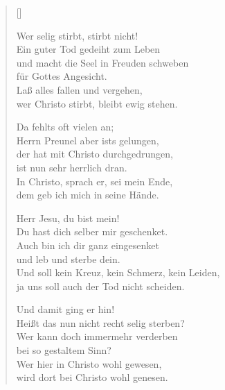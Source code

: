 \begin{multicols}{2}

\settowidth{\versewidth}{Und soll kein Kreuz, kein Schmerz, kein Leiden,}
\begin{verse}[\versewidth]

 Wer selig stirbt, stirbt nicht!\\
Ein guter Tod gedeiht zum Leben\\
und macht die Seel in Freuden schweben\\
für Gottes Angesicht.\\
Laß alles fallen und vergehen,\\
wer Christo stirbt, bleibt ewig stehen.

 Da fehlts oft vielen an;\\
Herrn Preunel aber ists gelungen,\\
der hat mit Christo durchgedrungen,\\
ist nun sehr herrlich dran.\\
In Christo, sprach er, sei mein Ende,\\
dem geb ich mich in seine Hände.

 Herr Jesu, du bist mein!\\
Du hast dich selber mir geschenket.\\
Auch bin ich dir ganz eingesenket\\
und leb und sterbe dein.\\
Und soll kein Kreuz, kein Schmerz, kein Leiden,\\
ja uns soll auch der Tod nicht scheiden.

 Und damit ging er hin!\\
Heißt das nun nicht recht selig sterben?\\
Wer kann doch immermehr verderben\\
bei so gestaltem Sinn?\\
Wer hier in Christo wohl gewesen,\\
wird dort bei Christo wohl genesen.

\end{verse}
\end{multicols}

